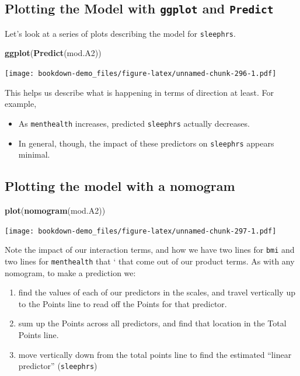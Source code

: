 \documentclass[]{book}
\newenvironment{Shaded}{\begin{snugshade}}{\end{snugshade}}
\newcommand{\KeywordTok}[1]{\textcolor[rgb]{0.13,0.29,0.53}{\textbf{#1}}}
\newcommand{\NormalTok}[1]{#1}
\providecommand{\tightlist}{%
  \setlength{\itemsep}{0pt}\setlength{\parskip}{0pt}}
\theoremstyle{definition}
\theoremstyle{definition}
\theoremstyle{definition}
\theoremstyle{remark}
\begin{document}
\subsection{\texorpdfstring{Plotting the Model with \texttt{ggplot} and
\texttt{Predict}}{Plotting the Model with ggplot and Predict}}\label{plotting-the-model-with-ggplot-and-predict-2}

Let's look at a series of plots describing the model for
\texttt{sleephrs}.

\begin{Shaded}
\begin{Highlighting}[]
\KeywordTok{ggplot}\NormalTok{(}\KeywordTok{Predict}\NormalTok{(mod.A2))}
\end{Highlighting}
\end{Shaded}

\texttt{[image: bookdown-demo\_files/figure-latex/unnamed-chunk-296-1.pdf]}

This helps us describe what is happening in terms of direction at least.
For example,

\begin{itemize}
\tightlist
\item
  As \texttt{menthealth} increases, predicted \texttt{sleephrs} actually
  decreases.
\item
  In general, though, the impact of these predictors on
  \texttt{sleephrs} appears minimal.
\end{itemize}

\subsection{Plotting the model with a
nomogram}\label{plotting-the-model-with-a-nomogram-2}

\begin{Shaded}
\begin{Highlighting}[]
\KeywordTok{plot}\NormalTok{(}\KeywordTok{nomogram}\NormalTok{(mod.A2))}
\end{Highlighting}
\end{Shaded}

\texttt{[image: bookdown-demo\_files/figure-latex/unnamed-chunk-297-1.pdf]}

Note the impact of our interaction terms, and how we have two lines for
\texttt{bmi} and two lines for \texttt{menthealth} that ` that come out
of our product terms. As with any nomogram, to make a prediction we:

\begin{enumerate}
\def\labelenumi{\arabic{enumi}.}
\tightlist
\item
  find the values of each of our predictors in the scales, and travel
  vertically up to the Points line to read off the Points for that
  predictor.
\item
  sum up the Points across all predictors, and find that location in the
  Total Points line.
\item
  move vertically down from the total points line to find the estimated
  ``linear predictor'' (\texttt{sleephrs})
\end{enumerate}
\end{document}
